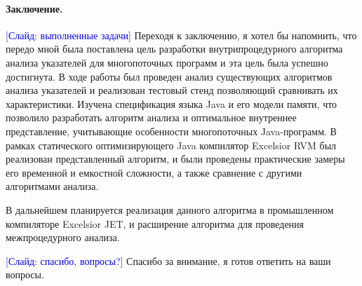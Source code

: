 \documentclass[12pt]{article}
\newcommand{\slide}[1]{\textcolor{Blue}{[Слайд: #1]}}
\begin{document}
  \paragraph{Заключение.}
  \slide{выполненные задачи}
  Переходя к заключению, я хотел бы напомнить, что передо мной была поставлена
  цель разработки внутрипроцедурного алгоритма анализа указателей для
  многопоточных программ и эта цель была успешно достигнута.
  В ходе работы был проведен анализ существующих алгоритмов анализа указателей
  и реализован тестовый стенд позволяющий сравнивать их характеристики.
  Изучена спецификация языка Java и его модели памяти, что позволило
  разработать алгоритм анализа и оптимальное внутреннее представление,
  учитывающие особенности многопоточных Java-программ. В рамках статического
  оптимизирующего Java компилятор Excelsior RVM был реализован представленный
  алгоритм, и были проведены практические замеры его временной и емкостной
  сложности, а также сравнение с другими алгоритмами анализа.

  В дальнейшем планируется реализация данного алгоритма в промышленном
  компиляторе Excelsior JET, и расширение алгоритма для проведения
  межпроцедурного анализа.

  \slide{спасибо, вопросы?}
  Спасибо за внимание, я готов ответить на ваши вопросы.
\end{document}
